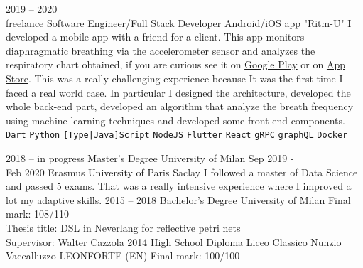 \documentclass[9pt]{developercv} %
\begin{document}
\begin{entrylist}
	\entry
		{2019 -- 2020\\\footnotesize{freelance}}
		{Software Engineer/Full Stack Developer}
		{Android/iOS app "Ritm-U"}
		{
			I developed a mobile app with a friend for a client. This app 
			monitors diaphragmatic breathing via the accelerometer sensor 
			and analyzes the respiratory chart obtained, if you are curious see 
			it on \href{https://play.google.com/store/apps/details?id=com.ritmu.app}{Google Play} 
			or on \href{https://apps.apple.com/us/app/id1514766559}{App Store}. This was a really challenging experience 
			because It was the first time I faced a real world case. In particular 
			I designed the architecture, developed the whole back-end part, 
			developed an algorithm that analyze the breath frequency using machine learning techniques and developed some front-end components.
            \\ 
            \texttt{Dart}\slashsep
            \texttt{Python}\slashsep
            \texttt{[Type|Java]Script}\slashsep
            \texttt{NodeJS}\slashsep
            \texttt{Flutter}\slashsep
            \texttt{React}\slashsep
            \texttt{gRPC}\slashsep
            \texttt{graphQL}\slashsep
            \texttt{Docker}
        }
\end{entrylist}



\begin{entrylist}
	\entry
		{2018 -- in progress}
		{Master's Degree}
		{University of Milan}
		{}
	\entry
		{Sep 2019 - \\Feb 2020}
		{Erasmus}
		{University of Paris Saclay}
		{
			I followed a master of Data Science and passed 5 exams.
			That was a really intensive experience where I improved a lot my adaptive skills. 
		}
	\entry
		{2015 -- 2018}
		{Bachelor's Degree}
		{University of Milan}
		{
			Final mark: 108/110\\
			Thesis title: DSL in Neverlang for reflective petri nets\\
			Supervisor: \href{https://cazzola.di.unimi.it}{Walter Cazzola}
		}
	\entry
		{2014}
		{High School Diploma}
		{Liceo Classico Nunzio Vaccalluzzo LEONFORTE (EN)}
		{
			Final mark: 100/100\\
		}
\end{entrylist}
\end{document}
